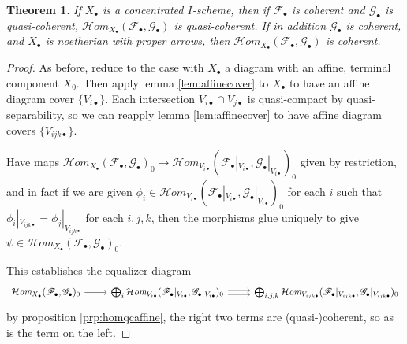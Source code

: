 \documentclass{amsart}
\newtheorem{theorem}{Theorem}
\theoremstyle{definition}
\newcommand{\cHom}{\mathcal{H} \textit{om}}
\newcommand{\FF}{\mathscr{F}}
\newcommand{\GG}{\mathscr{G}}
\begin{document}
\begin{theorem}
	If $X_\bullet$ is a concentrated $I$-scheme, then if $\FF_\bullet$ is coherent and $\GG_\bullet$ is quasi-coherent, $\cHom_{X_\bullet}(\FF_\bullet, \GG_\bullet)$ is quasi-coherent.
	If in addition $\GG_\bullet$ is coherent, and $X_\bullet$ is noetherian with proper arrows, then $\cHom_{X_\bullet}(\FF_\bullet, \GG_\bullet)$ is coherent.
\end{theorem}
\begin{proof}
	As before, reduce to the case with $X_\bullet$ a diagram with an affine, terminal component $X_0$.
	Then apply lemma \ref{lem:affinecover} to $X_\bullet$ to have an affine diagram cover $\{V_{i\bullet}\}$.
	Each intersection $V_{i \bullet} \cap V_{j \bullet}$ is quasi-compact by quasi-separability, so we can reapply lemma \ref{lem:affinecover} to have affine diagram covers $\{V_{ijk\bullet}\}$.
	
	Have maps $\cHom_{X_\bullet}(\FF_\bullet, \GG_\bullet)_0 \rightarrow \cHom_{V_{i\bullet}}(\FF_\bullet |_{V_{i\bullet}}, \GG_\bullet |_{V_{i \bullet}})_0$ given by restriction, and in fact if we are given $\phi_i \in \cHom_{V_{i\bullet}}(\FF_\bullet |_{V_{i\bullet}}, \GG_\bullet |_{V_{i \bullet}})_0$ for each $i$ such that $\phi_i |_{V_{ijk \bullet}} = \phi_j |_{V_{ijk \bullet}}$ for each $i, j, k$, then the morphisms glue uniquely to give $\psi \in \cHom_{X_\bullet}(\FF_\bullet, \GG_\bullet)_0$.
	
	This establishes the equalizer diagram
	\[
	\begin{tikzcd}
		\cHom_{X_\bullet}(\FF_\bullet, \GG_\bullet)_0 \arrow{r} & \bigoplus_i \cHom_{V_{i\bullet}}(\FF_\bullet |_{V_{i\bullet}}, \GG_\bullet |_{V_{i \bullet}})_0 \arrow[yshift=.5ex]{r} \arrow[yshift=-.5ex]{r} & \bigoplus_{i,j,k} \cHom_{V_{ijk\bullet}}(\FF_\bullet |_{V_{ijk\bullet}}, \GG_\bullet |_{V_{ijk \bullet}})_0
	\end{tikzcd}
	\]
	by proposition \ref{prp:homqcaffine}, the right two terms are (quasi-)coherent, so as is the term on the left.
\end{proof}
\end{document}
